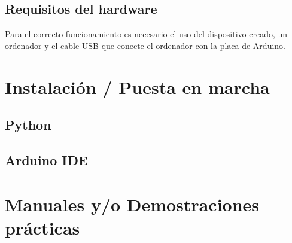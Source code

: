\subsection{Requisitos del hardware}
Para el correcto funcionamiento es necesario el uso del dispositivo creado, un ordenador y el cable USB que conecte el ordenador con la placa de Arduino.

\section{Instalación / Puesta en marcha}
\subsection{Python}

\subsection{Arduino IDE}

\section{Manuales y/o Demostraciones prácticas}




    
     